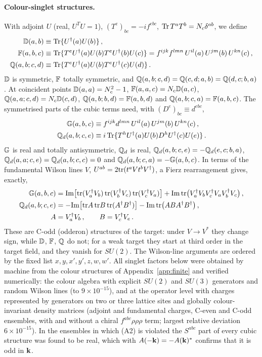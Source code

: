 \paragraph{Colour-singlet structures.} With adjoint $U$ (real, $U^TU=1$), $(T^e)_{bc}=-if^{ebc}$, ${\rm Tr}\,T^aT^b=N_c\delta^{ab}$, we define
\begin{align}\label{eq:DFQ}
\mathbb{D}(a,b)&\equiv{\rm Tr}\{U^\dagger(a)U(b)\}\,,\notag\\
\mathbb{F}(a,b,c)&\equiv{\rm Tr}\{T^eU^\dagger(a)U(b)T^eU^\dagger(b)U(c)\}=f^{ijk}f^{lmn}\,U^{il}(a)\,U^{jm}(b)\,U^{kn}(c)\,,\notag\\
\mathbb{Q}(a,b;c,d)&\equiv{\rm Tr}\{T^eU^\dagger(a)U(b)T^eU^\dagger(c)U(d)\}\,.
\end{align}
$\mathbb{D}$ is symmetric, $\mathbb{F}$ totally symmetric, and $\mathbb{Q}(a,b;c,d)=\mathbb{Q}(c,d;a,b)=\mathbb{Q}(d,c;b,a)$. At coincident points $\mathbb{D}(a,a)=N_c^2-1$, $\mathbb{F}(a,a,c)=N_c\mathbb{D}(a,c)$, $\mathbb{Q}(a,a;c,d)=N_c\mathbb{D}(c,d)$, $\mathbb{Q}(a,b;b,d)=\mathbb{F}(a,b,d)$ and $\mathbb{Q}(a,b;c,a)=\mathbb{F}(a,b,c)$. The symmetrised parts of the cubic terms need, with $(D^e)_{bc}\equiv d^{ebc}$,
\begin{align}\label{eq:GQd}
\mathbb{G}(a,b,c)&\equiv f^{ijk}d^{lmn}\,U^{il}(a)\,U^{jm}(b)\,U^{kn}(c)\,,\notag\\
\mathbb{Q}_d(a,b;c,e)&\equiv i\,{\rm Tr}\{T^hU^\dagger(a)U(b)D^hU^\dagger(c)U(e)\}\,.
\end{align}
$\mathbb{G}$ is real and totally antisymmetric, $\mathbb{Q}_d$ is real, $\mathbb{Q}_d(a,b;c,e)=-\mathbb{Q}_d(e,c;b,a)$, $\mathbb{Q}_d(a,a;c,e)=\mathbb{Q}_d(a,b;c,c)=0$ and $\mathbb{Q}_d(a,b;c,a)=-\mathbb{G}(a,b,c)$. In terms of the fundamental Wilson lines $V$, $U^{ab}=2{\rm tr}(t^aVt^bV^\dagger)$, a Fierz rearrangement gives, exactly,
\begin{align}\label{eq:Gfund}
\mathbb{G}(a,b,c)&={\rm Im}\big[{\rm tr}(V^\dagger_aV_b)\,{\rm tr}(V^\dagger_bV_c)\,{\rm tr}(V^\dagger_cV_a)\big]+{\rm Im}\,{\rm tr}\big(V^\dagger_aV_bV^\dagger_cV_aV^\dagger_bV_c\big)\,,\notag\\
\mathbb{Q}_d(a,b;c,e)&=-{\rm Im}\big[{\rm tr}A\,{\rm tr}B\,{\rm tr}(A^\dagger B^\dagger)\big]-{\rm Im}\,{\rm tr}\big(ABA^\dagger B^\dagger\big)\,,\notag\\
A&=V^\dagger_aV_b\,,\qquad B=V^\dagger_cV_e\,.
\end{align}
These are C-odd (odderon) structures of the target: under $V\to V^*$ they change sign, while $\mathbb{D}$, $\mathbb{F}$, $\mathbb{Q}$ do not; for a weak target they start at third order in the target field, and they vanish for $SU(2)$. The Wilson-line arguments are ordered by the fixed list $x,y,x',y',z,w,w'$. All singlet factors below were obtained by machine from the colour structures of Appendix~\ref{app:finite} and verified numerically: the colour algebra with explicit $SU(2)$ and $SU(3)$ generators and random Wilson lines (to $9\times10^{-15}$), and at the operator level with charges represented by generators on two or three lattice sites and globally colour-invariant density matrices (adjoint and fundamental charges, C-even and C-odd ensembles, with and without a chiral $f^{abc}\rho\rho\rho$ term; largest relative deviation $6\times10^{-15}$). In the ensembles in which (A2) is violated the $S^{abc}$ part of every cubic structure was found to be real, which with $A(-\mathbf{k})=-A(\mathbf{k})^*$ confirms that it is odd in $\mathbf{k}$.

